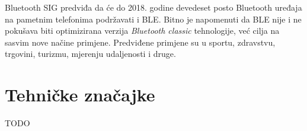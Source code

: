 Bluetooth SIG predviđa da će do 2018. godine devedeset posto Bluetooth uređaja na pametnim telefonima podržavati i BLE. 
Bitno je napomenuti da BLE nije i ne pokušava biti optimizirana verzija \textit{Bluetooth classic} tehnologije, već cilja na sasvim nove načine primjene. 
Predviđene primjene su u sportu, zdravstvu, trgovini, turizmu, mjerenju udaljenosti i druge.


\section*{Tehničke značajke}
TODO